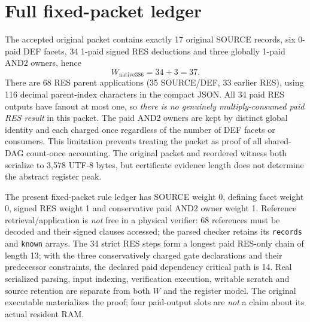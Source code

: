 \documentclass[11pt]{article}
\begin{document}
\section*{Full fixed-packet ledger}
The accepted original packet contains exactly 17 original SOURCE records, six 0-paid DEF facets, 34 1-paid signed RES deductions and three globally 1-paid AND2 owners, hence
\[
W_{\mathrm{native386}}=34+3=\boxed{37}.
\]
There are 68 RES parent applications (35 SOURCE/DEF, 33 earlier RES), using 116 decimal parent-index characters in the compact JSON. All 34 paid RES outputs have fanout at most one, so \emph{there is no genuinely multiply-consumed paid RES result} in this packet. The paid AND2 owners are kept by distinct global identity and each charged once regardless of the number of DEF facets or consumers. This limitation prevents treating the packet as proof of all shared-DAG count-once accounting. The original packet and reordered witness both serialize to 3,578 UTF-8 bytes, but certificate evidence length does not determine the abstract register peak.

The present fixed-packet rule ledger has SOURCE weight 0, defining facet weight 0, signed RES weight 1 and conservative paid AND2 owner weight 1. Reference retrieval/application is \emph{not} free in a physical verifier: 68 references must be decoded and their signed clauses accessed; the parsed checker retains its \texttt{records} and \texttt{known} arrays. The 34 strict RES steps form a longest paid RES-only chain of length 13; with the three conservatively charged gate declarations and their predecessor constraints, the declared paid dependency critical path is 14. Real serialized parsing, input indexing, verification execution, writable scratch and source retention are separate from both $W$ and the register model. The original executable materializes the proof; four paid-output slots are \emph{not} a claim about its actual resident RAM.
\end{document}
